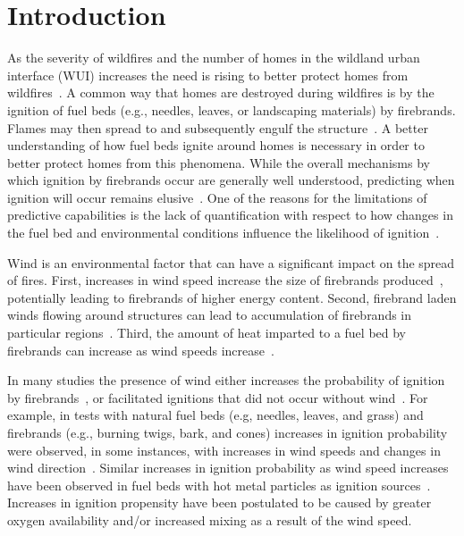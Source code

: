 \section{Introduction} 
\label{sec:introduction2}
    As the severity of wildfires and the number of homes in the wildland urban interface (WUI) increases the need is rising to better protect homes from wildfires~\cite{Marlon2012Long-termUSA, Manzello2013, Barrett2020}. A common way that homes are destroyed during wildfires is by the ignition of fuel beds (e.g., needles, leaves, or landscaping materials) by firebrands. Flames may then spread to and subsequently engulf the structure~\cite{Manzello2014, Maranghides2013NISTIgnitions}. A better understanding of how fuel beds ignite around homes is necessary in order to better protect homes from this phenomena. While the overall mechanisms by which ignition by firebrands occur are generally well understood, predicting when ignition will occur remains elusive~\cite{Fernandez-Pello2017}. One of the reasons for the limitations of predictive capabilities is the lack of quantification with respect to how changes in the fuel bed and environmental conditions influence the likelihood of ignition~\cite{Finney2013}.
    
    Wind is an environmental factor that can have a significant impact on the spread of fires. First, increases in wind speed increase the size of firebrands produced~\cite{Suzuki2013}, potentially leading to firebrands of higher energy content. Second, firebrand laden winds flowing around structures can lead to accumulation of firebrands in particular regions~\cite{Suzuki2020a, Manzello2014}. Third, the amount of heat imparted to a fuel bed by firebrands can increase as wind speeds increase~\cite{Hakes2019a, Tao2020, Salehizadeh2021}. 
    
    In many studies the presence of wind either increases the probability of ignition by firebrands~\cite{Filkov2016, Manzello2006, Manzello2006a, Matvienko2018, Ellis2015, Plucinski2008}, or facilitated ignitions that did not occur without wind~\cite{Ellis2011}. For example, in tests with natural fuel beds (e.g, needles, leaves, and grass) and firebrands (e.g., burning twigs, bark, and cones) increases in ignition probability were observed, in some instances, with increases in wind speeds and changes in wind direction~\cite{Ganteaume2009}. Similar increases in ignition probability as wind speed increases have been observed in fuel beds with hot metal particles as ignition sources~\cite{Wang2017}. Increases in ignition propensity have been postulated to be caused by greater oxygen availability and/or increased mixing as a result of the wind speed. 
    
